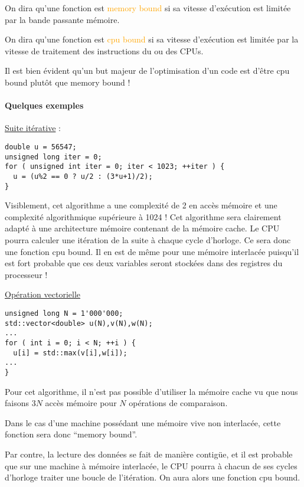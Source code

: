 \documentclass[fleqn,11pt]{article}
\begin{document}
On dira qu'une fonction est \textcolor{orange}{memory bound} si sa vitesse d'exécution est limitée par la bande passante mémoire.

On dira qu'une fonction est \textcolor{orange}{cpu bound} si sa vitesse d'exécution est limitée par la vitesse de traitement
des instructions du ou des CPUs.

Il est bien évident qu'un but majeur de l'optimisation d'un code est d'être cpu bound plutôt que memory bound !

\paragraph{Quelques exemples}

\underline{Suite itérative} :

\begin{lstlisting}
double u = 56547;
unsigned long iter = 0;
for ( unsigned int iter = 0; iter < 1023; ++iter ) {
  u = (u%2 == 0 ? u/2 : (3*u+1)/2);
}
\end{lstlisting}

Visiblement, cet algorithme a une complexité de 2 en accès mémoire et une complexité algorithmique supérieure
à 1024 ! Cet algorithme sera clairement adapté à une architecture mémoire contenant de la mémoire cache.
Le CPU pourra calculer une itération de la suite à chaque cycle d'horloge. Ce sera donc une fonction
cpu bound. Il en est de même pour une mémoire interlacée puisqu'il est fort probable que ces deux variables seront
stockées dans des registres du processeur !

\underline{Opération vectorielle}

\begin{lstlisting}
unsigned long N = 1'000'000;
std::vector<double> u(N),v(N),w(N);
...
for ( int i = 0; i < N; ++i ) {
  u[i] = std::max(v[i],w[i]);
...
}
\end{lstlisting}

Pour cet algorithme, il n'est pas possible d'utiliser la mémoire cache vu que nous faisons $3N$ accès mémoire
pour $N$ opérations de comparaison.

Dans le cas d'une machine possédant une mémoire vive non interlacée, cette fonction sera donc ``memory bound''.

Par contre, la lecture des données se fait de manière contigüe, et il est probable que sur une machine à mémoire interlacée,
le CPU pourra à chacun de ses cycles d'horloge traiter une boucle de l'itération. On aura alors
une fonction cpu bound.
\end{document}
